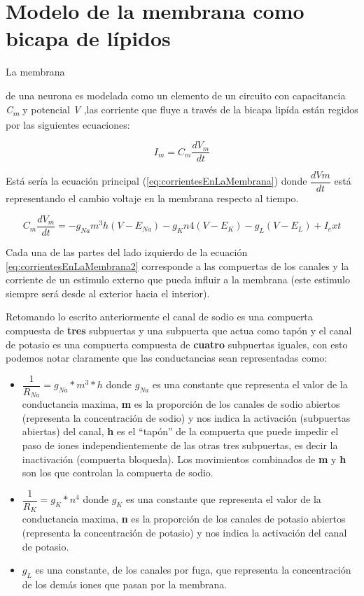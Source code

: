 \section{Modelo de la membrana como bicapa de lípidos}
\hypertarget{LaEq}{La membrana} de una neurona es modelada como un elemento de un circuito con capacitancia \emph{C\textsubscript{m}} y potencial \emph{V} ,las corriente que fluye a través de la bicapa lipída están regidos por las siguientes ecuaciones:

\begin{equation}
  I_{m} = C_{m} \dfrac{dV_{m}}{dt}
  \label{eq:corrientesEnLaMembrana}
\end{equation}

Está sería la ecuación principal (\ref{eq:corrientesEnLaMembrana}) donde \(\dfrac{dVm}{dt}\) está representando el cambio voltaje en la membrana respecto al tiempo.

\begin{equation}
  C_{m} \dfrac{dV_{m}}{dt} =  - g_{Na} m^3 h(V - E_{Na} ) - g_{K} n 4 (V - E_{K} ) - g_{L} (V - E_{L} ) + I_ext
  \label{eq:corrientesEnLaMembrana2}
\end{equation}

Cada una de las partes del lado izquierdo de la ecuación \ref{eq:corrientesEnLaMembrana2} corresponde a las compuertas de los canales y la corriente de un estimulo externo que pueda influir a la membrana (este estimulo siempre será desde al exterior hacia el interior).

Retomando lo escrito anteriormente el canal de sodio es una compuerta compuesta de \textbf{tres} subpuertas y una subpuerta que actua como tapón y el canal de potasio es una compuerta compuesta de \textbf{cuatro} subpuertas iguales, \hypertarget{secc} {con esto podemos notar claramente que las conductancias sean representadas como}:

\begin{itemize}
 \item \(\dfrac{1}{R_{Na}} = g_{Na} * m ^3 * h \) donde \(g_{Na}\) es una constante que representa el valor de la conductancia maxima, \textbf{m} es la proporción de los canales de sodio abiertos (representa la concentración de sodio) y nos indica la activación (subpuertas abiertas) del canal, \textbf{h} es el “tapón” de la compuerta que puede impedir el paso de iones independientemente de las otras tres subpuertas, es decir la inactivación (compuerta bloqueda).
Los movimientos combinados de \textbf{m} y \textbf{h} son los que controlan la compuerta de sodio.
 \item \(\dfrac{1}{R_{K}} = g_{K} * n^4\) donde \(g_{K}\) es una constante que representa el valor de la conductancia maxima, \textbf{n} es la proporción de los canales de potasio abiertos (representa la concentración de potasio) y nos indica la activación del canal de potasio.
 \item \(g_{L}\) es una constante, de los canales por fuga, que representa la concentración de los demás iones que pasan por la membrana.
\end{itemize}

